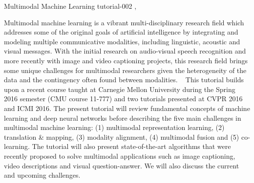 \begin{tutorial}
  {Multimodal Machine Learning}
  {tutorial-002}
  {\daydateyear, \tutorialmorningtime}
  {\TutLocB}

Multimodal machine learning is a vibrant multi-disciplinary research field which addresses some of the original goals of artificial intelligence by integrating and modeling multiple communicative modalities, including linguistic, acoustic and visual messages. With the initial research on audio-visual speech recognition and more recently with image and video captioning projects, this research field brings some unique challenges for multimodal researchers given the heterogeneity of the data and the contingency often found between modalities.
 
This tutorial builds upon a recent course taught at Carnegie Mellon University during the Spring 2016 semester (CMU course 11-777) and two tutorials presented at CVPR 2016 and ICMI 2016. The present tutorial will review fundamental concepts of machine learning and deep neural networks before describing the five main challenges in multimodal machine learning: (1) multimodal representation learning, (2) translation \& mapping, (3) modality alignment, (4) multimodal fusion and (5) co-learning. The tutorial will also present state-of-the-art algorithms that were recently proposed to solve multimodal applications such as image captioning, video descriptions and visual question-answer. We will also discuss the current and upcoming challenges.
\end{tutorial}
